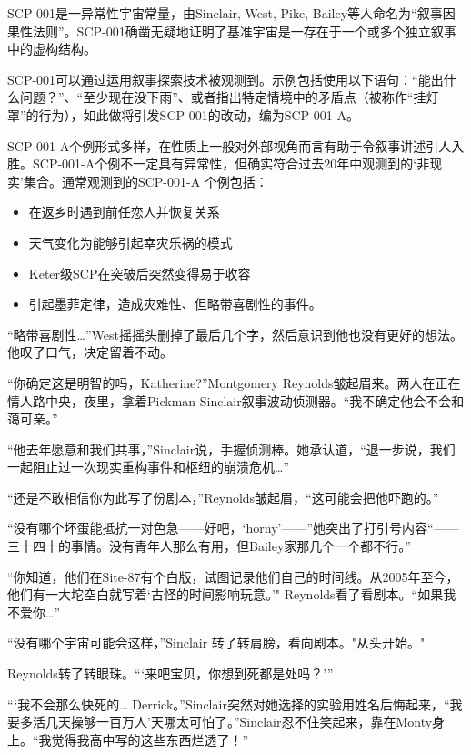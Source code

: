 \begin{scpbox}

SCP-001是一异常性宇宙常量，由Sinclair, West, Pike, Bailey等人命名为“叙事因果性法则”。SCP-001确凿无疑地证明了基准宇宙是一存在于一个或多个独立叙事中的虚构结构。

SCP-001可以通过运用叙事探索技术被观测到。示例包括使用以下语句：“能出什么问题？”、“至少现在没下雨”、或者指出特定情境中的矛盾点（被称作“挂灯罩”的行为），如此做将引发SCP-001的改动，编为SCP-001-A。

SCP-001-A个例形式多样，在性质上一般对外部视角而言有助于令叙事讲述引人入胜。SCP-001-A个例不一定具有异常性，但确实符合过去20年中观测到的‘非现实’集合。通常观测到的SCP-001-A 个例包括：

\begin{itemize}
\item 在返乡时遇到前任恋人并恢复关系
\item 天气变化为能够引起幸灾乐祸的模式
\item Keter级SCP在突破后突然变得易于收容
\item 引起墨菲定律，造成灾难性、但略带喜剧性的事件。
\end{itemize}

\end{scpbox}

“略带喜剧性…”West摇摇头删掉了最后几个字，然后意识到他也没有更好的想法。他叹了口气，决定留着不动。

\hr

“你确定这是明智的吗，Katherine?”Montgomery Reynolds皱起眉来。两人在正在情人路中央，夜里，拿着Pickman-Sinclair叙事波动侦测器。“我不确定他会不会和蔼可亲。”

“他去年愿意和我们共事，”Sinclair说，手握侦测棒。她承认道，“退一步说，我们一起阻止过一次现实重构事件和枢纽的崩溃危机…”

“还是不敢相信你为此写了份剧本，”Reynolds皱起眉，“这可能会把他吓跑的。”

“没有哪个坏蛋能抵抗一对色急——好吧，‘horny’——”她突出了打引号内容“——三十四十的事情。没有青年人那么有用，但Bailey家那几个一个都不行。”

“你知道，他们在Site-87有个白版，试图记录他们自己的时间线。从2005年至今，他们有一大坨空白就写着‘古怪的时间影响玩意。’" Reynolds看了看剧本。“如果我不爱你…”

“没有哪个宇宙可能会这样，”Sinclair 转了转肩膀，看向剧本。"从头开始。"

Reynolds转了转眼珠。“‘来吧宝贝，你想到死都是处吗？’”

“‘我不会那么快死的… Derrick。”Sinclair突然对她选择的实验用姓名后悔起来，“我要多活几天操够一百万人’天哪太可怕了。”Sinclair忍不住笑起来，靠在Monty身上。“我觉得我高中写的这些东西烂透了！”

